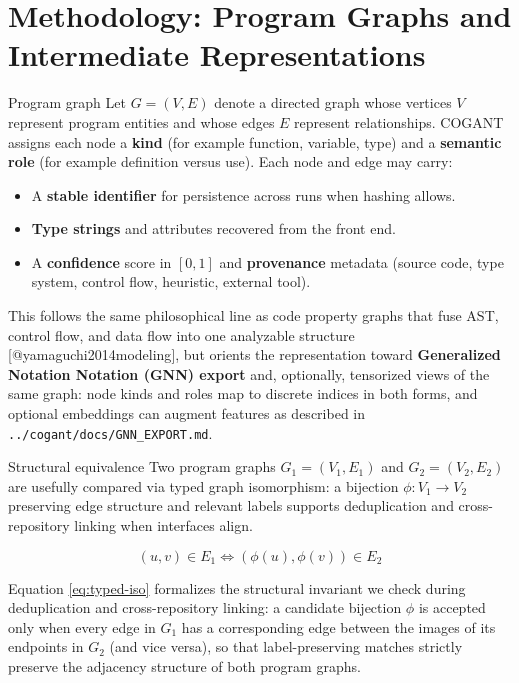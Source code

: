 \documentclass[
  ignorenonframetext,
]{beamer}
\author{\texorpdfstring{}{}}
\date{}
\providecommand{\tightlist}{%
  \setlength{\itemsep}{0pt}\setlength{\parskip}{0pt}}
\begin{document}
\section{Methodology: Program Graphs and Intermediate
Representations}\label{methodology-program-graphs-and-intermediate-representations}

\begin{frame}[fragile]{Program graph}
\protect{}\label{program-graph}
Let \(G = (V, E)\) denote a directed graph whose vertices \(V\)
represent program entities and whose edges \(E\) represent
relationships. COGANT assigns each node a \textbf{kind} (for example
function, variable, type) and a \textbf{semantic role} (for example
definition versus use). Each node and edge may carry:

\begin{itemize}
\tightlist
\item
  A \textbf{stable identifier} for persistence across runs when hashing
  allows.
\item
  \textbf{Type strings} and attributes recovered from the front end.
\item
  A \textbf{confidence} score in \([0,1]\) and \textbf{provenance}
  metadata (source code, type system, control flow, heuristic, external
  tool).
\end{itemize}

This follows the same philosophical line as code property graphs that
fuse AST, control flow, and data flow into one analyzable structure
{[}@yamaguchi2014modeling{]}, but orients the representation toward
\textbf{Generalized Notation Notation (GNN) export} and, optionally,
tensorized views of the same graph: node kinds and roles map to discrete
indices in both forms, and optional embeddings can augment features as
described in \texttt{../cogant/docs/GNN\_EXPORT.md}.

\begin{block}{Structural equivalence}
\protect{}\label{structural-equivalence}
Two program graphs \(G_1 = (V_1, E_1)\) and \(G_2 = (V_2, E_2)\) are
usefully compared via typed graph isomorphism: a bijection
\(\phi : V_1 \to V_2\) preserving edge structure and relevant labels
supports deduplication and cross-repository linking when interfaces
align.

\begin{equation}
\label{eq:typed-iso}
(u, v) \in E_1 \iff (\phi(u), \phi(v)) \in E_2
\end{equation}

Equation \ref{eq:typed-iso} formalizes the structural invariant we check
during deduplication and cross-repository linking: a candidate bijection
\(\phi\) is accepted only when every edge in \(G_1\) has a corresponding
edge between the images of its endpoints in \(G_2\) (and vice versa), so
that label-preserving matches strictly preserve the adjacency structure
of both program graphs.
\end{block}
\end{frame}
\end{document}
